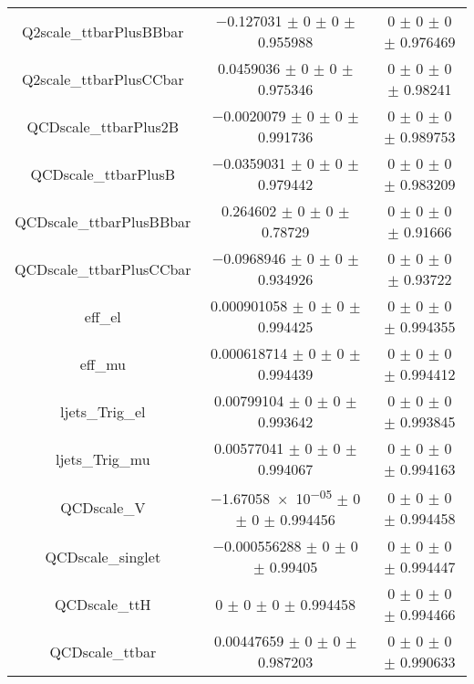 \begin{table}
\begin{tabular}{ccc}
Q2scale\_ttbarPlusBBbar & \num{-0.127031} $\pm$ \num{0} $\pm$ \num{0} $\pm$ \num{0.955988} & \num{0} $\pm$ \num{0} $\pm$ \num{0} $\pm$ \num{0.976469}\\
Q2scale\_ttbarPlusCCbar & \num{0.0459036} $\pm$ \num{0} $\pm$ \num{0} $\pm$ \num{0.975346} & \num{0} $\pm$ \num{0} $\pm$ \num{0} $\pm$ \num{0.98241}\\
QCDscale\_ttbarPlus2B & \num{-0.0020079} $\pm$ \num{0} $\pm$ \num{0} $\pm$ \num{0.991736} & \num{0} $\pm$ \num{0} $\pm$ \num{0} $\pm$ \num{0.989753}\\
QCDscale\_ttbarPlusB & \num{-0.0359031} $\pm$ \num{0} $\pm$ \num{0} $\pm$ \num{0.979442} & \num{0} $\pm$ \num{0} $\pm$ \num{0} $\pm$ \num{0.983209}\\
QCDscale\_ttbarPlusBBbar & \num{0.264602} $\pm$ \num{0} $\pm$ \num{0} $\pm$ \num{0.78729} & \num{0} $\pm$ \num{0} $\pm$ \num{0} $\pm$ \num{0.91666}\\
QCDscale\_ttbarPlusCCbar & \num{-0.0968946} $\pm$ \num{0} $\pm$ \num{0} $\pm$ \num{0.934926} & \num{0} $\pm$ \num{0} $\pm$ \num{0} $\pm$ \num{0.93722}\\
eff\_el & \num{0.000901058} $\pm$ \num{0} $\pm$ \num{0} $\pm$ \num{0.994425} & \num{0} $\pm$ \num{0} $\pm$ \num{0} $\pm$ \num{0.994355}\\
eff\_mu & \num{0.000618714} $\pm$ \num{0} $\pm$ \num{0} $\pm$ \num{0.994439} & \num{0} $\pm$ \num{0} $\pm$ \num{0} $\pm$ \num{0.994412}\\
ljets\_Trig\_el & \num{0.00799104} $\pm$ \num{0} $\pm$ \num{0} $\pm$ \num{0.993642} & \num{0} $\pm$ \num{0} $\pm$ \num{0} $\pm$ \num{0.993845}\\
ljets\_Trig\_mu & \num{0.00577041} $\pm$ \num{0} $\pm$ \num{0} $\pm$ \num{0.994067} & \num{0} $\pm$ \num{0} $\pm$ \num{0} $\pm$ \num{0.994163}\\
QCDscale\_V & \num{-1.67058e-05} $\pm$ \num{0} $\pm$ \num{0} $\pm$ \num{0.994456} & \num{0} $\pm$ \num{0} $\pm$ \num{0} $\pm$ \num{0.994458}\\
QCDscale\_singlet & \num{-0.000556288} $\pm$ \num{0} $\pm$ \num{0} $\pm$ \num{0.99405} & \num{0} $\pm$ \num{0} $\pm$ \num{0} $\pm$ \num{0.994447}\\
QCDscale\_ttH & \num{0} $\pm$ \num{0} $\pm$ \num{0} $\pm$ \num{0.994458} & \num{0} $\pm$ \num{0} $\pm$ \num{0} $\pm$ \num{0.994466}\\
QCDscale\_ttbar & \num{0.00447659} $\pm$ \num{0} $\pm$ \num{0} $\pm$ \num{0.987203} & \num{0} $\pm$ \num{0} $\pm$ \num{0} $\pm$ \num{0.990633}\\

\end{tabular}
\end{table}
